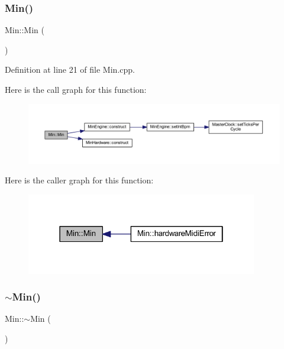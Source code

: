 \subsubsection{\texorpdfstring{Min()}{Min()}}
{\footnotesize\ttfamily Min\+::\+Min (\begin{DoxyParamCaption}{ }\end{DoxyParamCaption})}



Definition at line 21 of file Min.\+cpp.

Here is the call graph for this function\+:
\nopagebreak
\begin{figure}[H]
\begin{center}
\leavevmode
\includegraphics[width=350pt]{class_min_a136258f6eb36642c84deb93ab60be785_cgraph}
\end{center}
\end{figure}
Here is the caller graph for this function\+:
\nopagebreak
\begin{figure}[H]
\begin{center}
\leavevmode
\includegraphics[width=286pt]{class_min_a136258f6eb36642c84deb93ab60be785_icgraph}
\end{center}
\end{figure}
\mbox{\label{class_min_a53df82489feb20336ea097d190a8d8db}} 
\subsubsection{\texorpdfstring{$\sim$\+Min()}{~Min()}}
{\footnotesize\ttfamily Min\+::$\sim$\+Min (\begin{DoxyParamCaption}{ }\end{DoxyParamCaption})}



